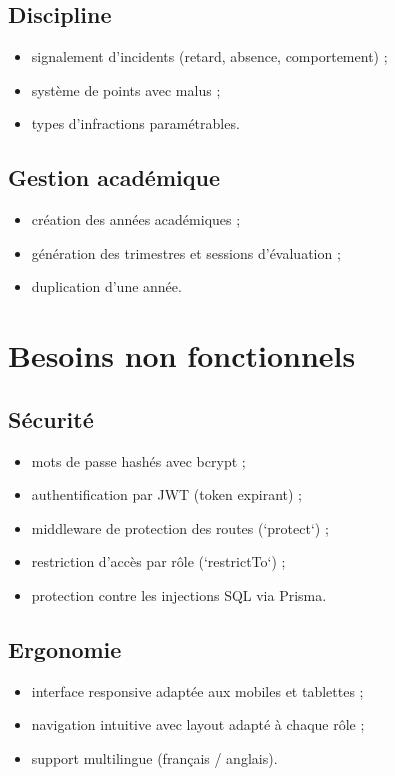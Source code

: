 \documentclass[12pt, a4paper]{report}
\begin{document}
\subsection{Discipline}
\begin{itemize}[noitemsep]
    \item signalement d'incidents (retard, absence, comportement) ;
    \item système de points avec malus ;
    \item types d'infractions paramétrables.
\end{itemize}

\subsection{Gestion académique}
\begin{itemize}[noitemsep]
    \item création des années académiques ;
    \item génération des trimestres et sessions d'évaluation ;
    \item duplication d'une année.
\end{itemize}

\section{Besoins non fonctionnels}

\subsection{Sécurité}
\begin{itemize}[noitemsep]
    \item mots de passe hashés avec bcrypt ;
    \item authentification par JWT (token expirant) ;
    \item middleware de protection des routes (`protect`) ;
    \item restriction d'accès par rôle (`restrictTo`) ;
    \item protection contre les injections SQL via Prisma.
\end{itemize}

\subsection{Ergonomie}
\begin{itemize}[noitemsep]
    \item interface responsive adaptée aux mobiles et tablettes ;
    \item navigation intuitive avec layout adapté à chaque rôle ;
    \item support multilingue (français / anglais).
\end{itemize}
\end{document}
